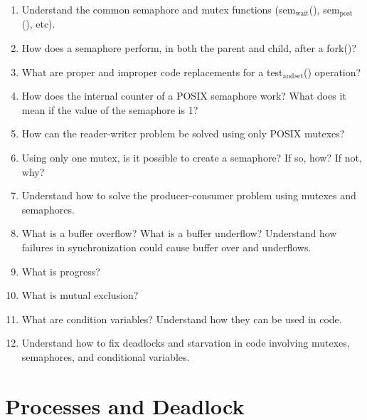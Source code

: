 \documentclass[11pt]{article}
\begin{document}
\begin{enumerate}
\item Understand the common semaphore and mutex functions (sem$_{\mathrm{wait}}$(),
      sem$_{\mathrm{post}}$(), etc).
\item How does a semaphore perform, in both the parent and child, after
      a fork()?
\item What are proper and improper code replacements for a
     test$_{\mathrm{and}}$$_{\mathrm{set}}$() operation?
\item How does the internal counter of a POSIX semaphore work? What does
    it mean if the value of the semaphore is 1?
\item How can the reader-writer problem be solved using only POSIX mutexes?
\item Using only one mutex, is it possible to create a semaphore? If
      so, how? If not, why?
\item Understand how to solve the producer-consumer problem using
      mutexes and semaphores.
\item What is a buffer overflow? What is a buffer underflow? Understand how failures in synchronization could cause buffer over and underflows.
\item What is progress?
\item What is mutual exclusion?
\item What are condition variables? Understand how they can be used in
     code.
\item Understand how to fix deadlocks and starvation in code involving mutexes, semaphores, and conditional variables.
\end{enumerate}
\section{Processes and Deadlock}
\label{sec-14}
\end{document}
